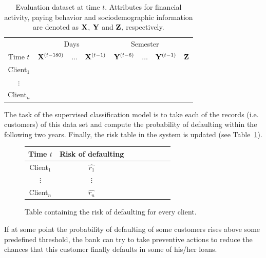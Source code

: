 \begin{itemize}
\begin{table}[h]
\centering
\begin{tabular}{c|ccc|ccc|c}
	&\multicolumn{3}{c|}{Days} & \multicolumn{3}{c|}{Semester} \\
     Time $t$              & $\mathbf{X}^{(t-180)}$ & $\ldots$ & $\mathbf{X}^{(t-1)} $ & $\mathbf{Y}^{(t-6)}$  & $\ldots$ & $\mathbf{Y}^{(t-1)} $ & $\mathbf{Z}$  \\  
\hline
Client$_1$  &                                                  &              &                     &                               &                     &        \\ 
$\vdots$      &                                                 &               &                     &                                &                     &      \\ 
Client$_n$  &                                                &               &                     &                                &                     &     \\ 
\end{tabular}
\caption{Evaluation dataset at time $t$. Attributes for financial activity, paying behavior and sociodemographic information are denoted as $\mathbf{X}$, $\mathbf{Y}$ and $\mathbf{Z}$, respectively.}
\label{tab:EvaluationDataset} 
\end{table}

The task of the supervised classification model is to take each of the records (i.e. customers) of this data set and compute the probability of defaulting within the following two years. Finally, the risk table in the system is updated (see Table~\ref{tab:riskTable}).

\begin{figure}[h]
\centering
\begin{tabular}{c|ccc|ccc|c}
     Time $t$  & Risk of defaulting \\  
\hline
Client$_1$  &    $\hat{r_1}$  \\ 
$\vdots$      &   $\vdots$   \\ 
Client$_n$  &   $\hat{r_n}$  \\ 
\end{tabular} 
\caption{Table containing the risk of defaulting for every client.}
\label{tab:riskTable}
\end{figure}


If at some point the probability of defaulting of some customers rises above some predefined threshold, the bank can try to take preventive actions to reduce the chances that this customer finally defaults in some of his/her loans.


\end{itemize}
